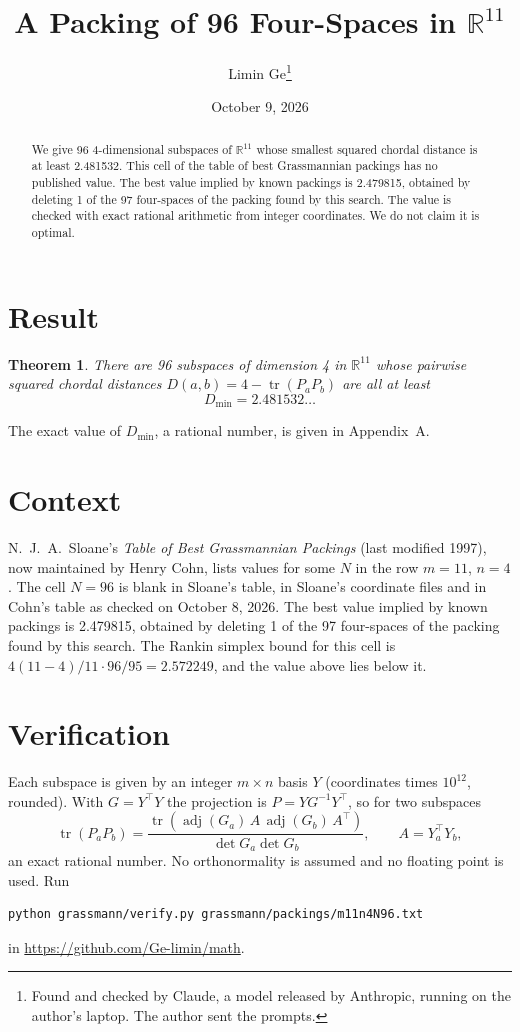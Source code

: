 \documentclass[11pt,a4paper]{article}
\title{A Packing of 96 Four-Spaces in $\mathbb{R}^{11}$}
\author{Limin Ge\thanks{Found and checked by Claude, a model released by Anthropic, running on the author's laptop. The author sent the prompts.}}
\date{October 9, 2026}
\newtheorem*{theorem}{Theorem}
\begin{document}
\maketitle
\begin{abstract}
We give 96 4-dimensional subspaces of $\mathbb{R}^{11}$ whose smallest squared chordal distance is at least 2.481532. This cell of the table of best Grassmannian packings has no published value. The best value implied by known packings is 2.479815, obtained by deleting 1 of the 97 four-spaces of the packing found by this search. The value is checked with exact rational arithmetic from integer coordinates. We do not claim it is optimal.
\end{abstract}

\section{Result}
\begin{theorem}
There are 96 subspaces of dimension 4 in $\mathbb{R}^{11}$ whose pairwise squared chordal distances $D(a,b) = 4 - \operatorname{tr}(P_aP_b)$ are all at least
\[ D_{\min} = 2.481532\ldots \]
\end{theorem}
The exact value of $D_{\min}$, a rational number, is given in Appendix~A.


\section{Context}
N.~J.~A.~Sloane's \emph{Table of Best Grassmannian Packings} (last modified 1997), now maintained by Henry Cohn, lists values for some $N$ in the row $m=11$, $n=4$. The cell $N=96$ is blank in Sloane's table, in Sloane's coordinate files and in Cohn's table as checked on October 8, 2026. The best value implied by known packings is 2.479815, obtained by deleting 1 of the 97 four-spaces of the packing found by this search. The Rankin simplex bound for this cell is $4(11-4)/11\cdot 96/95 = 2.572249$, and the value above lies below it.


\section{Verification}
Each subspace is given by an integer $m\times n$ basis $Y$ (coordinates times $10^{12}$, rounded). With $G=Y^\top Y$ the projection is $P=YG^{-1}Y^\top$, so for two subspaces
\[ \operatorname{tr}(P_aP_b)=\frac{\operatorname{tr}(\operatorname{adj}(G_a)\,A\,\operatorname{adj}(G_b)\,A^\top)}{\det G_a\det G_b},\qquad A=Y_a^\top Y_b, \]
an exact rational number. No orthonormality is assumed and no floating point is used. Run
\begin{verbatim}
python grassmann/verify.py grassmann/packings/m11n4N96.txt
\end{verbatim}
in \url{https://github.com/Ge-limin/math}.
\end{document}
